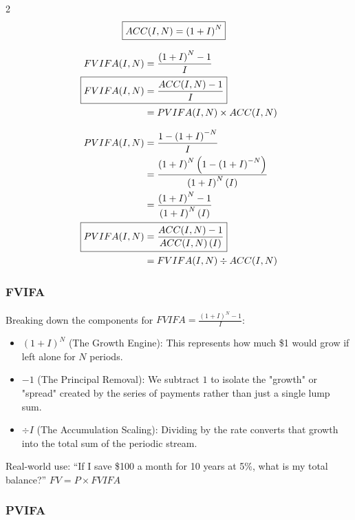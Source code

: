 \documentclass[11pt]{article}%
\begin{document}
\begin{multicols*}{2}
\begin{align}
\Aboxed{ACC(I, N) &= \left( 1 + I \right)^{N}} \label{eqn:acc} 
\end{align}

\begin{align}
FVIFA(I, N) &= \frac{\left( 1 + I \right)^{N} - 1}{I} \\
\Aboxed{FVIFA(I, N) &= \frac{ACC(I, N) - 1}{I}} \label{eqn:fvifa} \\
 &= PVIFA(I, N) \times ACC(I, N)
\end{align}

\begin{align}
PVIFA(I, N) &= \frac{1 - \left( 1 + I \right)^{-N}}{I} \\
 &= \frac{\left( 1 + I \right)^{N} \left(1 - \left( 1 + I \right)^{-N}\right)}{\left( 1 + I \right)^{N} \left( I \right)} \\
  &= \frac{\left( 1 + I \right)^{N}  - 1}{\left( 1 + I \right)^{N} \left( I \right)} \\
\Aboxed{PVIFA(I, N) &= \frac{ACC(I, N) - 1}{ACC(I, N) \left( I \right)}} \label{eqn:pvifa} \\
 &= FVIFA(I, N) \div ACC(I, N)
\end{align}

\subsubsection{FVIFA}\label{sec:fvifa}

Breaking down the components for $FVIFA = \frac{\left( 1 + I \right)^{N} - 1}{I}$:

\begin{itemize}
\item $\left(1+I\right)^{N}$ (The Growth Engine): This represents how much \$1 would grow if left alone for $N$ periods.

\item $-1$ (The Principal Removal): We subtract $1$ to isolate the "growth" or "spread" created by the series of payments rather than just a single lump sum.

\item $\div I$ (The Accumulation Scaling): Dividing by the rate converts that growth into the total sum of the periodic stream.
\end{itemize}

Real-world use: ``If I save \$100 a month for 10 years at 5\%, what is my total balance?'' $FV = P \times FVIFA$

\subsubsection{PVIFA}\label{sec:pvifa}


\end{multicols*}
\end{document}
